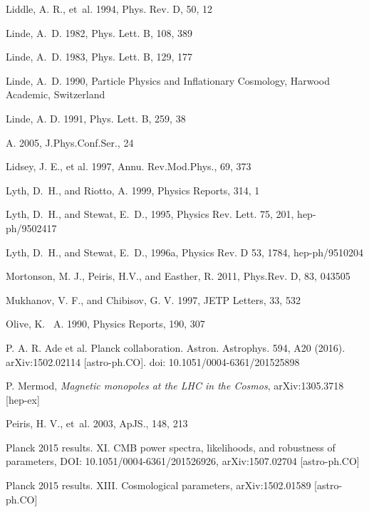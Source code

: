 \documentclass{rmaa}
\begin{document}
\begin{thebibliography}
  Liddle, A. R., et~al. 1994, Phys. Rev. D, 50, 12
  
Linde, A.~D. 1982, Phys. Lett. B, 108,  389 
 
 Linde, A.~D. 1983, Phys. Lett. B, 129, 177 

 Linde, A.~D. 1990, Particle Physics and Inflationary Cosmology, Harwood Academic,
Switzerland 

 Linde, A. D. 1991, Phys. Lett. B,  259, 38
 
 A. 2005, J.Phys.Conf.Ser., 24 
 
  Lidsey, J. E., et al. 1997, Annu. Rev.Mod.Phys., 69,  373  
 
Lyth, D.~H., and {Riotto,} A. 1999, Physics Reports, 314, 1

Lyth, D.~H., and {Stewat,} E.~D., 1995, Physics Rev. Lett. 75, 201, hep-ph/9502417

Lyth, D.~H., and {Stewat,} E.~D., 1996a, Physics Rev. D 53, 1784, hep-ph/9510204

Mortonson, M. J., Peiris, H.V., and Easther, R. 2011, Phys.Rev. D, 83, 043505 
  
 Mukhanov, V. F., and {Chibisov,} G. V. 1997, JETP Letters, 33, 532
  
 Olive, K. ~A. 1990, Physics Reports, 190, 307  

P.  A.  R.  Ade  et  al.  Planck  collaboration.  Astron.  Astrophys. 594, A20 (2016). arXiv:1502.02114 [astro-ph.CO]. doi: 10.1051/0004-6361/201525898

P. Mermod, \textit{Magnetic monopoles at the LHC in the Cosmos}, arXiv:1305.3718 [hep-ex]

Peiris, H. V., et~al. 2003, ApJS., 148, 213  

Planck 2015 results. XI. CMB power spectra, likelihoods, and robustness of parameters,  	DOI: 10.1051/0004-6361/201526926, arXiv:1507.02704 [astro-ph.CO] 

Planck 2015 results. XIII. Cosmological parameters,  	arXiv:1502.01589 [astro-ph.CO]


\end{thebibliography}
\end{document}
